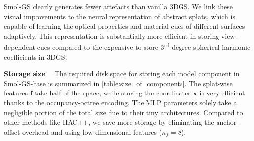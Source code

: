 \documentclass{article}
\def\vf{{\bm{f}}}
\def\vx{{\bm{x}}}
\newcommand{\ours}{Smol-GS\xspace}
\renewcommand{\paragraph}[1]{\noindent\textbf{#1}~~}
\begin{document}
\ours clearly generates fewer artefacts than vanilla 3DGS. We link these visual improvements to the neural representation of abstract splats, which is capable of learning the optical properties and material cues of different surfaces adaptively. This representation is substantially more efficient in storing view-dependent cues compared to the expensive-to-store 3\textsuperscript{rd}-degree spherical harmonic coefficients in 3DGS.






\paragraph{Storage size}
The required disk space for storing each model component in \ours-base is summarized in \cref{table:size_of_components}. The splat-wise features $\vf$ take half of the space, while storing the coordinates $\vx$ is very efficient thanks to the occupancy-octree encoding. The MLP parameters solely take a negligible portion of the total size due to their tiny architectures. Compared to other methods like HAC++, we save more storage by eliminating the anchor-offset overhead and using low-dimensional features ($n_f=8$).
\end{document}
